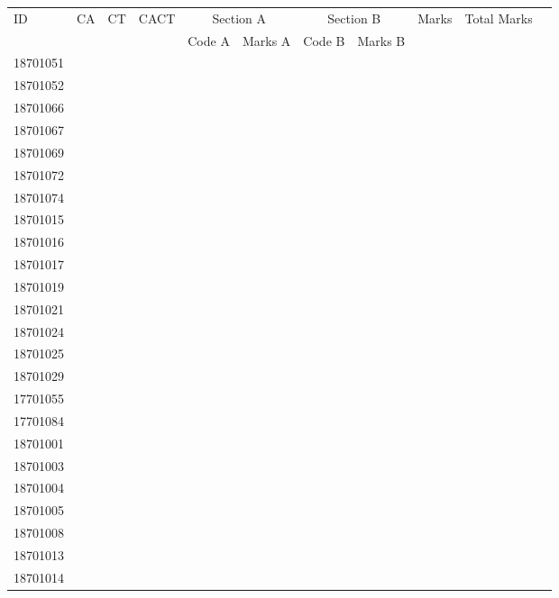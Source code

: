 \documentclass[12pt]{article}
\begin{document}
    \begin{center} 
	\renewcommand{\arraystretch}{1.08}
	\begin{small}
    \begin{tabular}{|l|c|c|c|c|c|c|c|c|c|c|} \hline
	\multirow{2}{*}{ID} & 	\multirow{2}{*}{CA}  & 	\multirow{2}{*}{CT}  & 	\multirow{2}{*}{CACT}  & \multicolumn{2 }{c|}{Section A}& \multicolumn{2 }{c|}{Section B} & 	\multirow{2}{*}{Marks}  & 	\multirow{2}{*}{Total Marks}  \\ 
	&  &  &  & Code A & Marks A & Code B & Marks B&  &  \\ \hline
18701051 &  &  &  &  &  &  &  &  & \\ \hline 
18701052 &  &  &  &  &  &  &  &  & \\ \hline 
18701066 &  &  &  &  &  &  &  &  & \\ \hline 
18701067 &  &  &  &  &  &  &  &  & \\ \hline 
18701069 &  &  &  &  &  &  &  &  & \\ \hline 
18701072 &  &  &  &  &  &  &  &  & \\ \hline 
18701074 &  &  &  &  &  &  &  &  & \\ \hline 
18701015 &  &  &  &  &  &  &  &  & \\ \hline 
18701016 &  &  &  &  &  &  &  &  & \\ \hline 
18701017 &  &  &  &  &  &  &  &  & \\ \hline 
18701019 &  &  &  &  &  &  &  &  & \\ \hline 
18701021 &  &  &  &  &  &  &  &  & \\ \hline 
18701024 &  &  &  &  &  &  &  &  & \\ \hline 
18701025 &  &  &  &  &  &  &  &  & \\ \hline 
18701029 &  &  &  &  &  &  &  &  & \\ \hline 
17701055 &  &  &  &  &  &  &  &  & \\ \hline 
17701084 &  &  &  &  &  &  &  &  & \\ \hline 
18701001 &  &  &  &  &  &  &  &  & \\ \hline 
18701003 &  &  &  &  &  &  &  &  & \\ \hline 
18701004 &  &  &  &  &  &  &  &  & \\ \hline 
18701005 &  &  &  &  &  &  &  &  & \\ \hline 
18701008 &  &  &  &  &  &  &  &  & \\ \hline 
18701013 &  &  &  &  &  &  &  &  & \\ \hline 
18701014 &  &  &  &  &  &  &  &  & \\ \hline 

\end{tabular}
\end{small}
\end{center}
\end{document}
